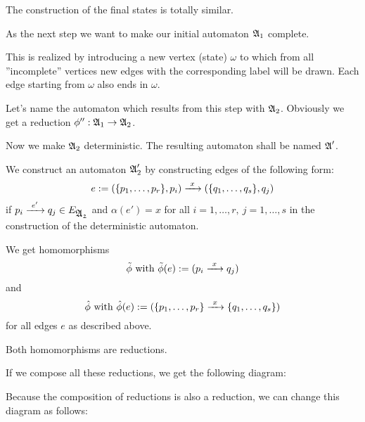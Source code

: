 The construction of the final states is totally similar.

As the next step we want to make our initial automaton $\mbox{$\mathfrak{A}$}_1$ complete.

This is realized by introducing a new vertex (state) $\omega$ to which from all 
''incomplete'' vertices new edges with the corresponding label will be drawn.
Each edge starting from $\omega$ also ends in $\omega$.

Let's name the automaton which results from this step with $\mbox{$\mathfrak{A}$}_2$. Obviously
we get a reduction $\phi'' : \mbox{$\mathfrak{A}$}_1 \to \mbox{$\mathfrak{A}$}_2$.

Now we make $\mbox{$\mathfrak{A}$}_2$ deterministic. The resulting automaton shall be named
$\mbox{$\mathfrak{A}$}'$.

We construct an automaton $\mbox{$\mathfrak{A}$}_2'$ by constructing edges of the following
form:
\[ e := (\{p_1, \ldots, p_r\}, p_i) \xrightarrow{\ {x}\ } (\{q_1, \ldots, q_s\}, q_j) \]
if $p_i \xrightarrow{\ {e'}\ } q_j \in E_{\mbox{$\mathfrak{A_2}$}}$ and $\alpha(e') = x$ for all $i = 1,
\ldots,r,\ j = 1, \ldots, s$ in the construction of the deterministic automaton.

We get homomorphisms
\[ \tilde{\phi} \mbox{ with } \tilde{\phi}(e) := (p_i \xrightarrow{\ {x}\ } q_j) \]
and 
\[ \hat{\phi} \mbox{ with } \hat{\phi}(e) := (\{p_1, \ldots, p_r\} \xrightarrow{\ {x}\ }
\{q_1, \ldots, q_s\}) \]
for all edges $e$ as described above.

Both homomorphisms are reductions.

If we compose all these reductions, we get the following diagram:

\begin{center}
\end{center}

Because the composition of reductions is also a reduction, we can change this
diagram as follows:

\begin{center}
\end{center}

